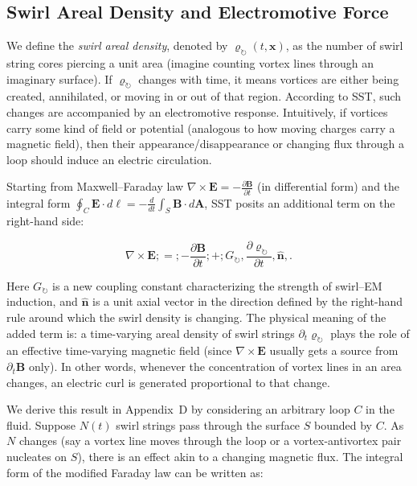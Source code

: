 \documentclass[10pt,reprint,aps,onecolumn,nofootinbib]{revtex4-2}
\begin{document}
\subsection{Swirl Areal Density and Electromotive Force}

We define the \textit{swirl areal density}, denoted by $\varrho_{\circlearrowright}(t, \mathbf{x})$, as the number of swirl string cores piercing a unit area (imagine counting vortex lines through an imaginary surface). If $\varrho_{\circlearrowright}$ changes with time, it means vortices are either being created, annihilated, or moving in or out of that region. According to SST, such changes are accompanied by an electromotive response. Intuitively, if vortices carry some kind of field or potential (analogous to how moving charges carry a magnetic field), then their appearance/disappearance or changing flux through a loop should induce an electric circulation.


Starting from Maxwell–Faraday law $\nabla \times \mathbf{E} = -\frac{\partial \mathbf{B}}{\partial t}$ (in differential form) and the integral form $\oint_{C} \mathbf{E}\cdot d\bm{\ell} = -\frac{d}{dt}\int_{S} \mathbf{B}\cdot d\mathbf{A}$, SST posits an additional term on the right-hand side:

\begin{equation}

\nabla \times \mathbf{E} ;=; -\frac{\partial \mathbf{B}}{\partial t} ;+; G_{\circlearrowright},\frac{\partial \varrho_{\circlearrowright}}{\partial t},\mathbf{\hat{n}},.

\label{eq:ModifiedFaraday}

\end{equation}

Here $G_{\circlearrowright}$ is a new coupling constant characterizing the strength of swirl–EM induction, and $\mathbf{\hat{n}}$ is a unit axial vector in the direction defined by the right-hand rule around which the swirl density is changing. The physical meaning of the added term is: a time-varying areal density of swirl strings $\partial_t \varrho_{\circlearrowright}$ plays the role of an effective time-varying magnetic field (since $\nabla \times \mathbf{E}$ usually gets a source from $\partial_t \mathbf{B}$ only). In other words, whenever the concentration of vortex lines in an area changes, an electric curl is generated proportional to that change.


We derive this result in Appendix~D by considering an arbitrary loop $C$ in the fluid. Suppose $N(t)$ swirl strings pass through the surface $S$ bounded by $C$. As $N$ changes (say a vortex line moves through the loop or a vortex-antivortex pair nucleates on $S$), there is an effect akin to a changing magnetic flux. The integral form of the modified Faraday law can be written as:
\end{document}
